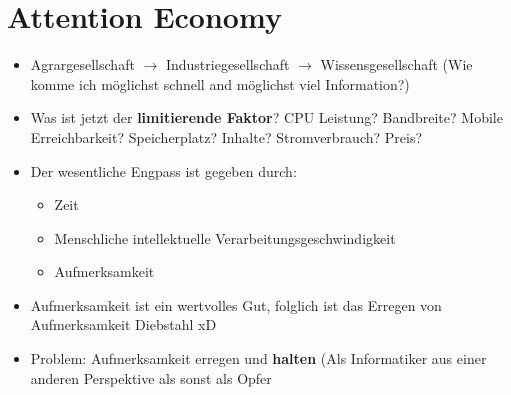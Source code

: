 \documentclass{article} %
\begin{document}
\section{Attention Economy}
	\begin{itemize}
		\item Agrargesellschaft $\rightarrow$ Industriegesellschaft $\rightarrow$ Wissensgesellschaft (Wie komme ich möglichst schnell and möglichst viel Information?)
		\item Was ist jetzt der \textbf{limitierende Faktor}? CPU Leistung? Bandbreite? Mobile Erreichbarkeit? Speicherplatz? Inhalte? Stromverbrauch? Preis?
		\item Der wesentliche Engpass ist gegeben durch:
		\begin{itemize}
			\item Zeit
			\item Menschliche intellektuelle Verarbeitungsgeschwindigkeit
			\item Aufmerksamkeit
		\end{itemize}
		\item Aufmerksamkeit ist ein wertvolles Gut, folglich ist das Erregen von Aufmerksamkeit Diebstahl xD
		\item Problem: Aufmerksamkeit erregen und \textbf{halten} (Als Informatiker aus einer anderen Perspektive als sonst als \glqq Opfer\grqq
	\end{itemize}
\end{document}
